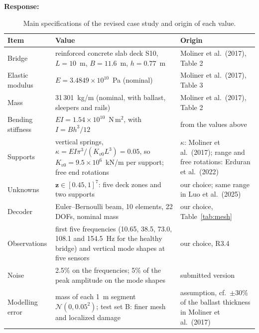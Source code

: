 \documentclass[11pt]{article}
\newenvironment{response}{\par\smallskip\noindent\color{resp}\textbf{Response:}\ }{\par}
\newcommand{\z}{\mathbf{z}}
\begin{document}
\begin{response}
\begin{table}[H]
\centering\small
\caption{Main specifications of the revised case study and origin of each value.}
\label{tab:specs}
\footnotesize
\begin{tabular}{p{3.5cm}p{6.8cm}p{4.5cm}}
\toprule
Item & Value & Origin \\
\midrule
Bridge & reinforced concrete slab deck S10, $L=10$~m, $B=11.6$~m, $h=0.77$~m & Moliner et al.\ (2017), Table 2 \\
Elastic modulus & $E=3.4849\times10^{10}$~Pa (nominal) & Moliner et al.\ (2017), Table 3 \\
Mass & 31\,301~kg/m (nominal, with ballast, sleepers and rails) & Moliner et al.\ (2017), Table 2 \\
Bending stiffness & $EI=1.54\times10^{10}$~N\,m$^2$, with $I=Bh^3/12$ & from the values above \\
Supports & vertical springs, $\kappa=EI\pi^3/(K_{v0}L^3)=0.05$, so $K_{v0}=9.5\times10^{6}$~kN/m per support; free end rotations &
$\kappa$: Moliner et al.\ (2017); range and free rotations: Erduran et al.\ (2022) \\
Unknowns & $\z\in[0.45,1]^7$: five deck zones and two supports & our choice; same range in Luo et al.\ (2025) \\
Decoder & Euler--Bernoulli beam, 10 elements, 22 DOFs, nominal mass & our choice, Table~\ref{tab:mesh} \\
Observations & first five frequencies (10.65, 38.5, 73.0, 108.1 and 154.5~Hz for the healthy bridge) and vertical mode shapes at five sensors & our choice, R3.4 \\
Noise & 2.5\% on the frequencies; 5\% of the peak amplitude on the mode shapes & submitted version \\
Modelling error & mass of each 1~m segment $\mathcal{N}(0,0.05^2)$; test set B: finer mesh and localized damage & assumption, cf.\ $\pm30\%$ of the ballast thickness in Moliner et al.\ (2017) \\
\bottomrule
\end{tabular}
\end{table}



\end{response}
\end{document}
